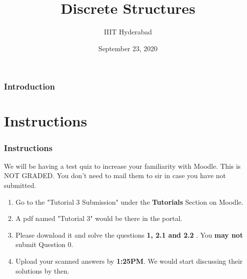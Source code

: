 \documentclass[xcolor=svgnames]{beamer}
\title[Discrete Structures]{Discrete Structures} %
\author{IIIT Hyderabad} %
\institute[] %
{
Monsoon 2020 \\ %
\medskip
\textit{Tutorial 3} %
}
\date{September 23, 2020} %
\begin{document}
\begin{frame}
\titlepage %
\end{frame}

\begin{frame}
\frametitle{Introduction} %
\tableofcontents %
\end{frame}


\section{Instructions}


\begin{frame}
\frametitle{Instructions}
We will be having a test quiz to increase your familiarity with Moodle. This is NOT GRADED. You don't need to mail them to sir in case you have not submitted.
\begin{enumerate}
    \item Go to the "Tutorial 3 Submission" under the \textbf{Tutorials} Section on Moodle.
    \item A pdf named "Tutorial 3" would be there in the portal. 
    \item Please download it and solve the questions \textbf{1, 2.1 and 2.2} . You \textbf{may not} submit Question 0.
    \item Upload your scanned answers by \textbf{1:25PM}. We would start discussing their solutions by then.
\end{enumerate}
\end{frame}



\end{document}
